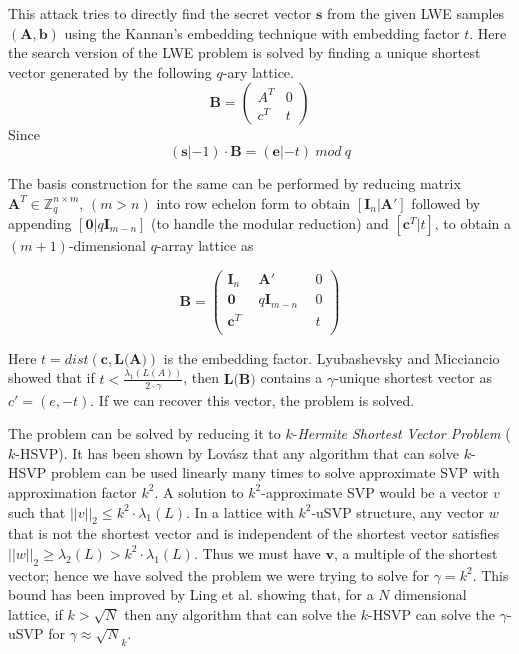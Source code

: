 This attack tries to directly find the secret vector $\textbf{s}$ from the given LWE samples $(\textbf{A},\textbf{b})$ using the Kannan's embedding technique \cite{kannan1987minkowski} with embedding factor $t$. %
Here the search version of the LWE problem is solved by finding a unique shortest vector generated by the following $q$-ary lattice.
\begin{equation*}
    \textbf{B} =\begin{pmatrix}
        A^T & 0 \\
        c^T & t
    \end{pmatrix}
\end{equation*}
Since
\begin{equation*}
    (\textbf{s}|-1)\cdot \textbf{B}=(\textbf{e} | -t) \ mod\ q
\end{equation*}

The basis construction for the same can be performed by reducing matrix $\textbf{A}^T \in \mathbb{Z}_q^{n\times m}$, $(m>n)$ into row echelon form to obtain $[\textbf{I}_{n} | \textbf{A}']$ followed by appending $[\textbf{0}|q\textbf{I}_{m-n}]$ (to handle the modular reduction) and $[\textbf{c}^T|t]$, to obtain a $(m+1)$-dimensional $q$-array lattice as

\begin{equation*}
    \textbf{B} =\begin{pmatrix}
        \textbf{I}_{n}     \ \  & \textbf{A}'                   \ \  & 0 \\
        \textbf{0}         \ \  & q\textbf{I}_{m-n}             \ \  & 0 \\
        \textbf{c}^T       \ \  & \ \                                & t \\
    \end{pmatrix}
\end{equation*}

Here $t=dist(\textbf{c},\textbf{L(A)})$ is the embedding factor. Lyubashevsky and Micciancio \cite{lyubashevsky2009bounded} showed that if $t < \frac{\lambda_1{(L(A))}}{2\cdot \gamma}$, then $\textbf{L(B)}$ contains a $\gamma$-unique shortest vector as $c'=(e,-t)$. If we can recover this vector, the problem is solved.

The problem can be solved by reducing it to $k$-\textit{Hermite Shortest Vector Problem} ($k$-HSVP). It has been shown by Lov\'{a}sz \cite{lovasz1986algorithmic} that any algorithm that can solve $k$-HSVP problem can be used linearly many times to solve approximate SVP with approximation factor $k^2$. A solution to $k^2$-approximate SVP would be a vector $v$ such that $||v||_2 \leq k^2\cdot \lambda_1(L)$. In a lattice with $k^2$-uSVP structure, any vector $w$ that is not the shortest vector and is independent of the shortest vector satisfies $||w||_2 \geq \lambda_2(L) > k^2\cdot \lambda_1(L)$. Thus we must have $\textbf{v}$, a multiple of the shortest vector; hence we have solved the problem we were trying to solve for $\gamma=k^2$. This bound has been improved by Ling et al. \cite{luzzi2013decoding} showing that, for a $N$ dimensional lattice, if $k>\sqrt{N}$ then any algorithm that can solve the $k$-HSVP can solve the $\gamma$-uSVP for $\gamma \approx \sqrt{N}_k$.

